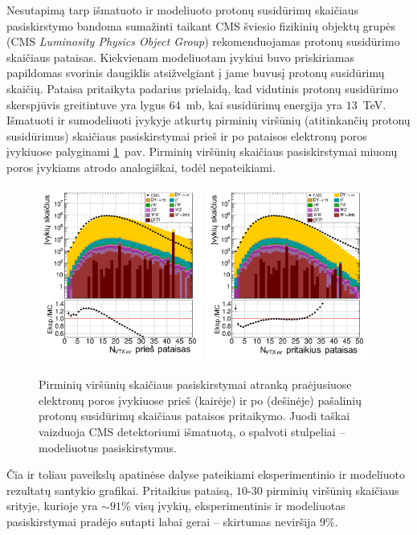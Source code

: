 \documentclass[a4paper, 12pt, oneside]{article}
\begin{document}
Nesutapimą tarp išmatuoto ir modeliuoto protonų susidūrimų skaičiaus pasiskirstymo bandoma sumažinti taikant
CMS šviesio fizikinių objektų grupės (CMS \textit{Luminosity Physics Object Group}) rekomenduojamas protonų
susidūrimo skaičiaus pataisas.
Kiekvienam modeliuotam įvykiui buvo priskiriamas papildomas svorinis daugiklis atsižvelgiant į jame buvusį protonų
susidūrimų skaičių.
Pataisa pritaikyta padarius prielaidą, kad vidutinis protonų susidūrimo skerspjūvis greitintuve yra lygus $64$~mb,
kai susidūrimų energija yra $13$~TeV.
Išmatuoti ir sumodeliuoti įvykyje atkurtų pirminių viršūnių (atitinkančių protonų susidūrimus) skaičiaus pasiskirstymai
prieš ir po pataisos elektronų poros įvykiuose palyginami \ref{fig:PUba}~pav.
Pirminių viršūnių skaičiaus pasiskirstymai miuonų poros įvykiams atrodo analogiškai, todėl nepateikiami.
\begin{figure}[b!]
	\includegraphics[width=0.48\textwidth]{Magistrinis/ee_nVTX_before.png}
	\includegraphics[width=0.48\textwidth]{Magistrinis/ee_nVTX_after.png}
	\vspace{-0.6cm}
	\caption{\label{fig:PUba} Pirminių viršūnių skaičiaus pasiskirstymai atranką praėjusiuose elektronų poros įvykiuose
		prieš (kairėje) ir po (dešinėje) pašalinių protonų susidūrimų skaičiaus pataisos pritaikymo.
		Juodi taškai vaizduoja CMS detektoriumi išmatuotą, o spalvoti stulpeliai -- modeliuotus pasiskirstymus.}
\end{figure}
Čia ir toliau paveikslų apatinėse dalyse pateikiami eksperimentinio ir modeliuoto rezultatų santykio grafikai.
Pritaikius pataisą, $10$-$30$ pirminių viršūnių skaičiaus srityje, kurioje yra $\sim\!91\%$ visų įvykių,
eksperimentinis ir modeliuotas pasiskirstymai pradėjo sutapti labai gerai -- skirtumas neviršija $9\%$.
\end{document}
